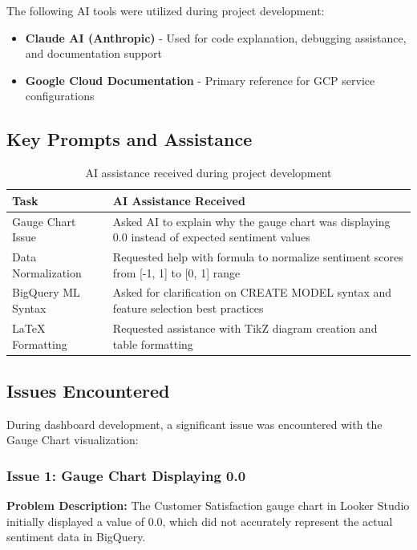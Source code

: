 \documentclass[12pt,a4paper]{article}
\begin{document}
The following AI tools were utilized during project development:

\begin{itemize}
    \item \textbf{Claude AI (Anthropic)} - Used for code explanation, debugging assistance, and documentation support
    \item \textbf{Google Cloud Documentation} - Primary reference for GCP service configurations
\end{itemize}

\subsection{Key Prompts and Assistance}

\begin{table}[H]
\centering
\begin{tabular}{|p{4cm}|p{10cm}|}
\hline
\textbf{Task} & \textbf{AI Assistance Received} \\
\hline
Gauge Chart Issue & Asked AI to explain why the gauge chart was displaying 0.0 instead of expected sentiment values \\
\hline
Data Normalization & Requested help with formula to normalize sentiment scores from [-1, 1] to [0, 1] range \\
\hline
BigQuery ML Syntax & Asked for clarification on CREATE MODEL syntax and feature selection best practices \\
\hline
LaTeX Formatting & Requested assistance with TikZ diagram creation and table formatting \\
\hline
\end{tabular}
\caption{AI assistance received during project development}
\end{table}

\subsection{Issues Encountered}

During dashboard development, a significant issue was encountered with the Gauge Chart visualization:

\subsubsection{Issue 1: Gauge Chart Displaying 0.0}

\textbf{Problem Description:}
The Customer Satisfaction gauge chart in Looker Studio initially displayed a value of 0.0, which did not accurately represent the actual sentiment data in BigQuery.
\end{document}
